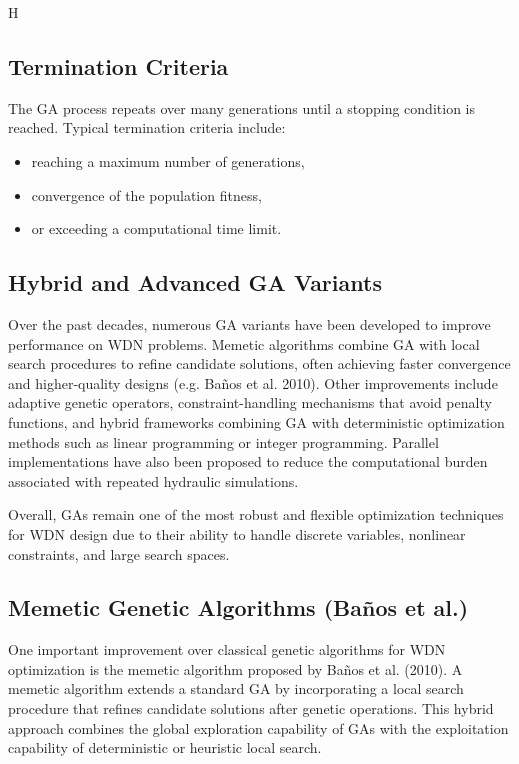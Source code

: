 H\documentclass[12pt, a4paper]{article}
\begin{document}
\subsection*{Termination Criteria}

The GA process repeats over many generations until a stopping condition is reached. Typical termination criteria include:

\begin{itemize}
\item reaching a maximum number of generations,
\item convergence of the population fitness,
\item or exceeding a computational time limit.
\end{itemize}

\subsection*{Hybrid and Advanced GA Variants}

Over the past decades, numerous GA variants have been developed to improve performance on WDN problems. Memetic algorithms combine GA with local search procedures to refine candidate solutions, often achieving faster convergence and higher-quality designs (e.g. Baños et al. 2010)\cite{ref16}. Other improvements include adaptive genetic operators, constraint-handling mechanisms that avoid penalty functions, and hybrid frameworks combining GA with deterministic optimization methods such as linear programming or integer programming\cite{ref15}. Parallel implementations have also been proposed to reduce the computational burden associated with repeated hydraulic simulations.

Overall, GAs remain one of the most robust and flexible optimization techniques for WDN design due to their ability to handle discrete variables, nonlinear constraints, and large search spaces.

\subsection*{Memetic Genetic Algorithms (Ba\~nos et al.)}

One important improvement over classical genetic algorithms for WDN optimization is the memetic algorithm proposed by Ba\~nos et al. (2010)\cite{ref16}. A memetic algorithm extends a standard GA by incorporating a local search procedure that refines candidate solutions after genetic operations. This hybrid approach combines the global exploration capability of GAs with the exploitation capability of deterministic or heuristic local search.
\end{document}
